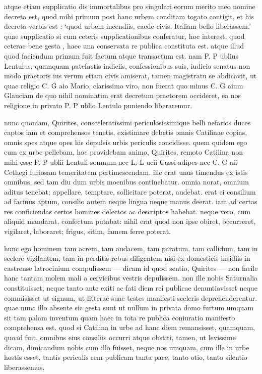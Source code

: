  atque etiam supplicatio dis immortalibus pro singulari eorum merito meo nomine decreta est, quod mihi primum post hanc urbem conditam togato contigit, et his decreta verbis est : `quod urbem incendiis, caede civis, Italiam bello liberassem.' quae supplicatio si cum ceteris supplicationibus conferatur, hoc interest, quod ceterae bene gesta , haec una conservata re publica constituta est. atque illud quod faciendum primum fuit factum atque transactum est. nam P. P ublius Lentulus, quamquam patefactis indiciis, confessionibus suis, iudicio senatus non modo praetoris ius verum etiam civis amiserat, tamen magistratu se abdicavit, ut quae religio C. G aio Mario, clarissimo viro, non fuerat quo minus C. G aium Glauciam de quo nihil nominatim erat decretum praetorem occideret, ea nos religione in privato P. P ublio Lentulo puniendo liberaremur.

 nunc quoniam, Quirites, consceleratissimi periculosissimique belli nefarios duces captos iam et comprehensos tenetis, existimare debetis omnis Catilinae copias, omnis spes atque opes his depulsis urbis periculis concidisse. quem quidem ego cum ex urbe pellebam, hoc providebam animo, Quirites, remoto Catilina non mihi esse P. P ublii Lentuli somnum nec L. L ucii Cassi adipes nec C. G aii Cethegi furiosam temeritatem pertimescendam. ille erat unus timendus ex istis omnibus, sed tam diu dum urbis moenibus continebatur. omnia norat, omnium aditus tenebat; appellare, temptare, sollicitare poterat, audebat. erat ei consilium ad facinus aptum, consilio autem neque lingua neque manus deerat. iam ad certas res conficiendas certos homines delectos ac descriptos habebat. neque vero, cum aliquid mandarat, confectum putabat: nihil erat quod non ipse obiret, occurreret, vigilaret, laboraret; frigus, sitim, famem ferre poterat.

 hunc ego hominem tam acrem, tam audacem, tam paratum, tam callidum, tam in scelere vigilantem, tam in perditis rebus diligentem nisi ex domesticis insidiis in castrense latrocinium compulissem — dicam id quod sentio, Quirites — non facile hanc tantam molem mali a cervicibus vestris depulissem. non ille nobis Saturnalia constituisset, neque tanto ante exiti ac fati diem rei publicae denuntiavisset neque commisisset ut signum, ut litterae suae testes manifesti sceleris deprehenderentur. quae nunc illo absente sic gesta sunt ut nullum in privata domo furtum umquam sit tam palam inventum quam haec in tota re publica coniuratio manifesto comprehensa est. quod si Catilina in urbe ad hanc diem remansisset, quamquam, quoad fuit, omnibus eius consiliis occurri atque obstiti, tamen, ut levissime dicam, dimicandum nobis cum illo fuisset, neque nos umquam, cum ille in urbe hostis esset, tantis periculis rem publicam tanta pace, tanto otio, tanto silentio liberassemus.

